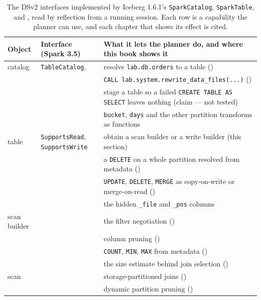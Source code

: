 \begin{table}[htbp]
\centering\footnotesize
\renewcommand{\arraystretch}{1.2}
\begin{tabular}{@{}P{1.9cm}P{5.8cm}P{6.5cm}@{}}
\toprule
\textbf{Object} & \textbf{Interface (Spark 3.5)} & \textbf{What it lets the planner do, and where this book shows it} \\
\midrule
catalog & \texttt{TableCatalog},  & resolve \texttt{lab.db.orders} to a table () \\
 &  & \texttt{CALL lab.system.rewrite\_data\_files(...)} () \\
 &  & stage a table so a failed \texttt{CREATE TABLE AS SELECT} leaves nothing (claim --- not tested) \\
 &  & \texttt{bucket}, \texttt{days} and the other partition transforms as functions \\
table & \texttt{SupportsRead}, \texttt{SupportsWrite} & obtain a scan builder or a write builder (this section) \\
 &  & a \texttt{DELETE} on a whole partition resolved from metadata () \\
 &  & \texttt{UPDATE}, \texttt{DELETE}, \texttt{MERGE} as copy-on-write or merge-on-read () \\
 &  & the hidden \texttt{\_file} and \texttt{\_pos} columns \\
scan builder &  & the filter negotiation () \\
 &  & column pruning () \\
 &  & \texttt{COUNT}, \texttt{MIN}, \texttt{MAX} from metadata () \\
 &  & the size estimate behind join selection () \\
scan &  & storage-partitioned joins () \\
 &  & dynamic partition pruning () \\
\bottomrule
\end{tabular}
\caption{The DSv2 interfaces implemented by Iceberg 1.6.1's \texttt{SparkCatalog},
\texttt{SparkTable},  and , read by
reflection from a running session. Each row is a capability the planner can use,
and each chapter that shows its effect is cited.}
\label{tab:dsv2-interfaces}
\end{table}

